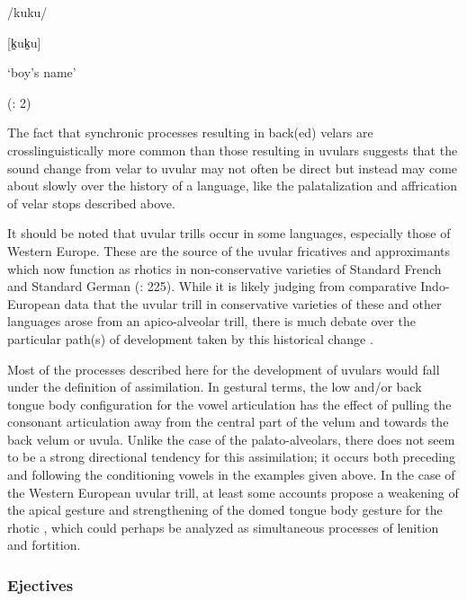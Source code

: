 /kuku/

[k̠uk̠u]

\glt ‘boy’s name’

(\citealt{BlackBlack1971}: 2)

\z

  The fact that synchronic processes resulting in back(ed) velars are crosslinguistically more common than those resulting in uvulars suggests that the sound change from velar to uvular may not often be direct but instead may come about slowly over the history of a language, like the palatalization and affrication of velar stops described above.

  It should be noted that uvular trills occur in some languages, especially those of Western Europe. These are the source of the uvular fricatives and approximants which now function as rhotics in non-conservative varieties of Standard French and Standard German (\citealt{LadefogedMaddieson1996}: 225). While it is likely judging from comparative Indo-European data that the uvular trill in conservative varieties of these and other languages arose from an apico-alveolar trill, there is much debate over the particular path(s) of development taken by this historical change \citep{Schiller1999}.

  Most of the processes described here for the development of uvulars would fall under the definition of assimilation. In gestural terms, the low and/or back tongue body configuration for the vowel articulation has the effect of pulling the consonant articulation away from the central part of the velum and towards the back velum or uvula. Unlike the case of the palato-alveolars, there does not seem to be a strong directional tendency for this assimilation; it occurs both preceding and following the conditioning vowels in the examples given above. In the case of the Western European uvular trill, at least some accounts propose a weakening of the apical gesture and strengthening of the domed tongue body gesture for the rhotic \citep{Schiller1999}, which could perhaps be analyzed as simultaneous processes of lenition and fortition.

\subsubsection{\rmfamily\bfseries} 
\subsubsection{{Ejectives} }\label{sec:4.5.2.3}

